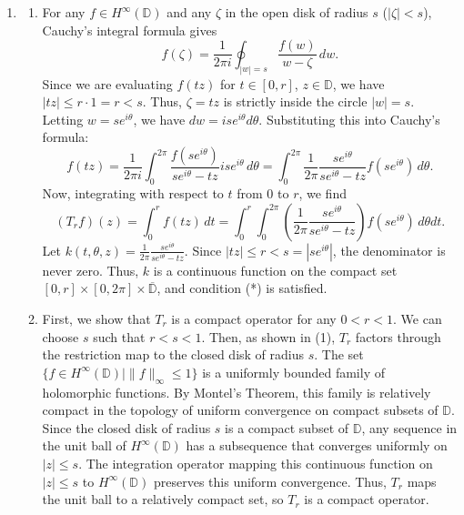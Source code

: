 \documentclass{article}
\begin{document}
\begin{enumerate}[label=\fbox{\arabic*}]
\begin{enumerate}[label=(\arabic*)]
\[          \]
          However, by the properties of complex numbers and the integral,
          \[
            \operatorname{Re} \left( e^{-i\alpha} \int_A f \, d\mu \right) \le \left| e^{-i\alpha} \int_A f \, d\mu \right| = \left| \int_A f \, d\mu \right|.
          \]
          This gives $\left| \int_A f \, d\mu \right| > L\mu(A)$, which contradicts the hypothesis of Proposition P. Therefore, the set where $|f(x)| > L$ must have measure zero, so $|f(x)| \le L$ for $\mu$-a.e. $x$.
        \end{enumerate}

  \item %
        \begin{enumerate}[label=(\arabic*)]
          \item For any $f \in H^\infty(\mathbb{D})$ and any $\zeta$ in the open disk of radius $s$ ($|\zeta| < s$), Cauchy's integral formula gives
          \[
            f(\zeta) = \frac{1}{2\pi i} \oint_{|w|=s} \frac{f(w)}{w - \zeta} \, dw.
          \]
          Since we are evaluating $f(tz)$ for $t \in [0, r]$, $z \in \mathbb{D}$, we have $|tz| \le r \cdot 1 = r < s$. Thus, $\zeta = tz$ is strictly inside the circle $|w|=s$. 
          Letting $w = s e^{i\theta}$, we have $dw = i s e^{i\theta} d\theta$. Substituting this into Cauchy's formula:
          \[
            f(tz) = \frac{1}{2\pi i} \int_0^{2\pi} \frac{f(s e^{i\theta})}{s e^{i\theta} - tz} i s e^{i\theta} \, d\theta = \int_0^{2\pi} \frac{1}{2\pi} \frac{s e^{i\theta}}{s e^{i\theta} - tz} f(s e^{i\theta}) \, d\theta.
          \]
          Now, integrating with respect to $t$ from $0$ to $r$, we find
          \[
            (T_r f)(z) = \int_0^r f(tz) \, dt = \int_0^r \int_0^{2\pi} \left( \frac{1}{2\pi} \frac{s e^{i\theta}}{s e^{i\theta} - tz} \right) f(s e^{i\theta}) \, d\theta dt.
          \]
          Let $k(t, \theta, z) = \frac{1}{2\pi} \frac{s e^{i\theta}}{s e^{i\theta} - tz}$. Since $|tz| \le r < s = |s e^{i\theta}|$, the denominator is never zero. Thus, $k$ is a continuous function on the compact set $[0, r] \times [0, 2\pi] \times \overline{\mathbb{D}}$, and condition (*) is satisfied.
          \item First, we show that $T_r$ is a compact operator for any $0 < r < 1$. We can choose $s$ such that $r < s < 1$. Then, as shown in (1), $T_r$ factors through the restriction map to the closed disk of radius $s$. The set $\{ f \in H^\infty(\mathbb{D}) \mid \|f\|_\infty \le 1 \}$ is a uniformly bounded family of holomorphic functions. By Montel's Theorem, this family is relatively compact in the topology of uniform convergence on compact subsets of $\mathbb{D}$. Since the closed disk of radius $s$ is a compact subset of $\mathbb{D}$, any sequence in the unit ball of $H^\infty(\mathbb{D})$ has a subsequence that converges uniformly on $|z| \le s$. The integration operator mapping this continuous function on $|z| \le s$ to $H^\infty(\mathbb{D})$ preserves this uniform convergence. Thus, $T_r$ maps the unit ball to a relatively compact set, so $T_r$ is a compact operator.
          

\end{enumerate}
\end{enumerate}
\end{document}
